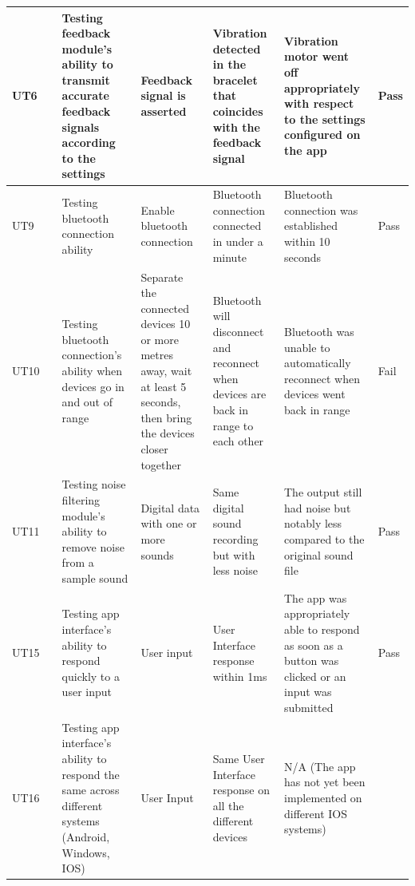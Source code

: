 \documentclass[12pt, titlepage]{article}
\begin{document}
\begin{longtable}{|p{1.4cm}|p{1cm}|p{3cm}|p{1.5cm}|p{2.5cm}|p{2cm}|p{1.2cm}|}
  UT6       &      & Testing feedback module's ability to transmit accurate feedback signals according to the settings  & Feedback signal is asserted              & Vibration detected in the bracelet that coincides with the feedback signal                          &      Vibration motor went off appropriately with respect to the settings configured on the app                        &   {\color[HTML]{32CB00} Pass}                    \\ \hline
  UT9       &      & Testing bluetooth connection ability                                     & Enable bluetooth connection                                  & Bluetooth connection connected in under a minute                    &         Bluetooth connection was established within 10 seconds               &             {\color[HTML]{32CB00} Pass}                                       \\ \hline
  UT10      &      & Testing bluetooth connection's ability when devices go in and out of range                                      & Separate the connected devices 10 or more metres away, wait at least 5 seconds, then bring the devices closer together                                  & Bluetooth will disconnect and reconnect when devices are back in range to each other                    &          Bluetooth was unable to automatically reconnect when devices went back in range            &                         {\color[HTML]{FE0000} Fail}                             \\ \hline
  UT11      &      & Testing noise filtering module's ability to remove noise from a sample sound                                      & Digital data with one or more sounds                                  & Same digital sound recording but with less noise                    &          The output still had noise but notably less compared to the original sound file              &                    {\color[HTML]{32CB00} Pass}                                \\ \hline
  UT15      &      & Testing app interface's ability to respond quickly to a user input                                      & User input                                  & User Interface response within 1ms                    &         The app was appropriately able to respond as soon as a button was clicked or an input was submitted               &                {\color[HTML]{32CB00} Pass}                                    \\ \hline
  UT16      &      & Testing app interface's ability to respond the same across different systems (Android, Windows, IOS)                                      & User Input                                  & Same User Interface response on all the different devices                    &        N/A (The app has not yet been implemented on different IOS systems)                &                  \cellcolor[HTML]{FFFFFF}{\color[HTML]{F8A102} N/A}                                  \\ \hline
\end{longtable}
\end{document}
